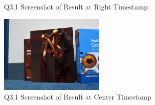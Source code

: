 \documentclass{article}
\begin{document}
\begin{figure}[H]
\begin{minipage}[b]{0.45\textwidth}
		\caption{Q3.1 Screenshot of Result at Right Timestamp}
		\label{fig:Q331_right}
	\end{minipage}
	\end{figure}	
	
	\begin{figure}[H]		
	\centering
	\includegraphics[width=0.45\textwidth]{./result/Q3_1_ar_result_overlay_cnter.jpg}  %
	\caption{Q3.1 Screenshot of Result at Center Timestamp}
	\label{fig:Q331_cnter}
	\end{figure}	
	
\end{document}
